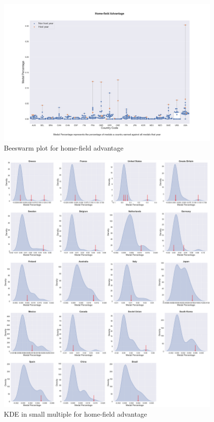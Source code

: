 \documentclass[12pt]{article}
\begin{document}
\begin{figure}
    \centering
    \includegraphics[angle=270, scale=0.33]{pics/g-2-8.png}
    \caption{Beeswarm plot for home-field advantage}
    \label{fig:my_label}
\end{figure}

\begin{figure}
    \centering
    \includegraphics[trim={0 0 0 10cm},clip, scale=0.15]{pics/g-2-9.png}
    \caption{KDE in small multiple for home-field advantage}
    \label{fig:my_label}
\end{figure}
\end{document}
